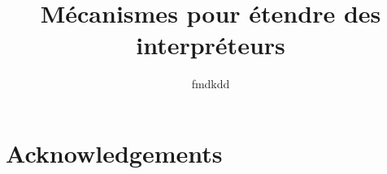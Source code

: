 

\title{Mécanismes pour étendre des interpréteurs}
\author{fmdkdd}




\frontmatter

\maketitle
\tableofcontents

\chapter*{Acknowledgements}


\mainmatter



\backmatter

\printbibliography


